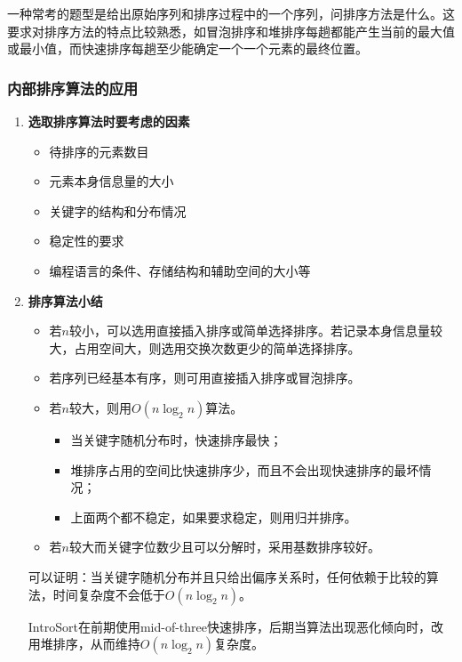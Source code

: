 \documentclass[12pt, a4paper, oneside]{ctexart}
\begin{document}
一种常考的题型是给出原始序列和排序过程中的一个序列，问排序方法是什么。这要求对排序方法的特点比较熟悉，如冒泡排序和堆排序每趟都能产生当前的最大值或最小值，而快速排序每趟至少能确定一个一个元素的最终位置。

\subsubsection{内部排序算法的应用}

\begin{enumerate}
  \item {\bf 选取排序算法时要考虑的因素}
  
  \begin{itemize}
    \item 待排序的元素数目
    \item 元素本身信息量的大小
    \item 关键字的结构和分布情况
    \item 稳定性的要求
    \item 编程语言的条件、存储结构和辅助空间的大小等
  \end{itemize}

  \item {\bf 排序算法小结}
  
  \begin{itemize}
    \item 若$n$较小，可以选用直接插入排序或简单选择排序。若记录本身信息量较大，占用空间大，则选用交换次数更少的简单选择排序。
    \item 若序列已经基本有序，则可用直接插入排序或冒泡排序。
    \item 若$n$较大，则用$O(n\log_2 n)$算法。
    \begin{itemize}
      \item 当关键字随机分布时，快速排序最快；
      \item 堆排序占用的空间比快速排序少，而且不会出现快速排序的最坏情况；
      \item 上面两个都不稳定，如果要求稳定，则用归并排序。
    \end{itemize}
    \item 若$n$较大而关键字位数少且可以分解时，采用基数排序较好。
  \end{itemize}

  可以证明：当关键字随机分布并且只给出偏序关系时，任何依赖于比较的算法，时间复杂度不会低于$O(n\log_2 n)$。

  \textcolor{juice-water-blue}{IntroSort在前期使用mid-of-three快速排序，后期当算法出现恶化倾向时，改用堆排序，从而维持$O(n\log_2 n)$复杂度。}
\end{enumerate}
\end{document}
